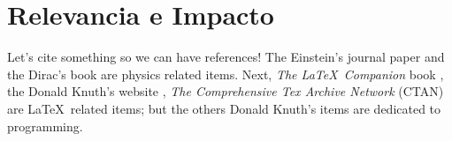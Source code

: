 \section{Relevancia e Impacto}\label{sec:relevancia}

Let's cite something so we can have references! The Einstein's journal paper
\cite{einstein} and the Dirac's book \cite{dirac} are physics related items.
Next, \textit{The \LaTeX\ Companion} book \cite{latexcompanion}, the Donald
Knuth's website \cite{knuthwebsite}, \textit{The Comprehensive Tex Archive
Network} (CTAN) \cite{ctan} are \LaTeX\ related items; but the others Donald
Knuth's items \cite{knuth-fa} are dedicated to programming.
